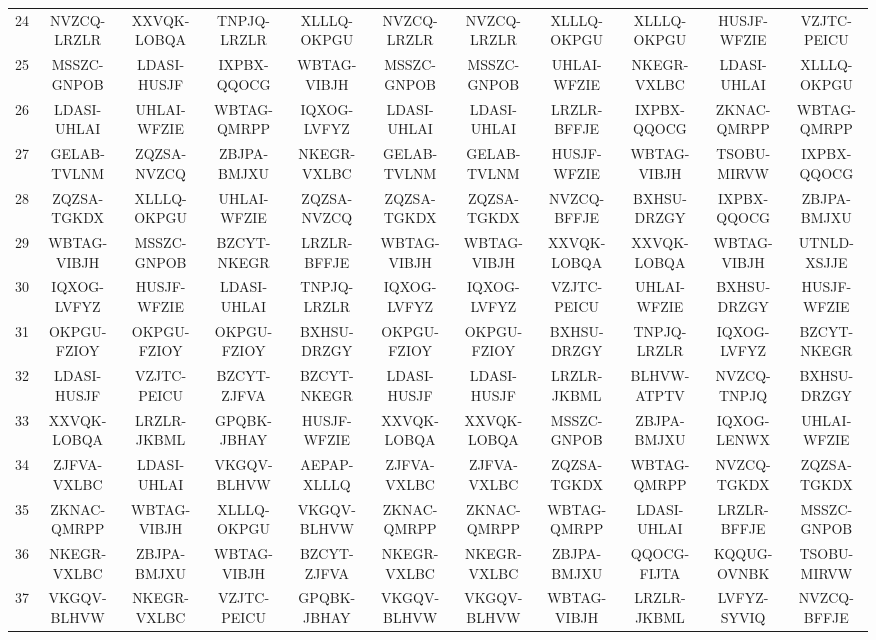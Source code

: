\begin{landscape}
{\begin{longtable}{ccccccccccc}
24 &  NVZCQ-LRZLR &  XXVQK-LOBQA &  TNPJQ-LRZLR &  XLLLQ-OKPGU &  NVZCQ-LRZLR &  NVZCQ-LRZLR &  XLLLQ-OKPGU &  XLLLQ-OKPGU &  HUSJF-WFZIE &  VZJTC-PEICU \\
25 &  MSSZC-GNPOB &  LDASI-HUSJF &  IXPBX-QQOCG &  WBTAG-VIBJH &  MSSZC-GNPOB &  MSSZC-GNPOB &  UHLAI-WFZIE &  NKEGR-VXLBC &  LDASI-UHLAI &  XLLLQ-OKPGU \\
26 &  LDASI-UHLAI &  UHLAI-WFZIE &  WBTAG-QMRPP &  IQXOG-LVFYZ &  LDASI-UHLAI &  LDASI-UHLAI &  LRZLR-BFFJE &  IXPBX-QQOCG &  ZKNAC-QMRPP &  WBTAG-QMRPP \\
27 &  GELAB-TVLNM &  ZQZSA-NVZCQ &  ZBJPA-BMJXU &  NKEGR-VXLBC &  GELAB-TVLNM &  GELAB-TVLNM &  HUSJF-WFZIE &  WBTAG-VIBJH &  TSOBU-MIRVW &  IXPBX-QQOCG \\
28 &  ZQZSA-TGKDX &  XLLLQ-OKPGU &  UHLAI-WFZIE &  ZQZSA-NVZCQ &  ZQZSA-TGKDX &  ZQZSA-TGKDX &  NVZCQ-BFFJE &  BXHSU-DRZGY &  IXPBX-QQOCG &  ZBJPA-BMJXU \\
29 &  WBTAG-VIBJH &  MSSZC-GNPOB &  BZCYT-NKEGR &  LRZLR-BFFJE &  WBTAG-VIBJH &  WBTAG-VIBJH &  XXVQK-LOBQA &  XXVQK-LOBQA &  WBTAG-VIBJH &  UTNLD-XSJJE \\
30 &  IQXOG-LVFYZ &  HUSJF-WFZIE &  LDASI-UHLAI &  TNPJQ-LRZLR &  IQXOG-LVFYZ &  IQXOG-LVFYZ &  VZJTC-PEICU &  UHLAI-WFZIE &  BXHSU-DRZGY &  HUSJF-WFZIE \\
31 &  OKPGU-FZIOY &  OKPGU-FZIOY &  OKPGU-FZIOY &  BXHSU-DRZGY &  OKPGU-FZIOY &  OKPGU-FZIOY &  BXHSU-DRZGY &  TNPJQ-LRZLR &  IQXOG-LVFYZ &  BZCYT-NKEGR \\
32 &  LDASI-HUSJF &  VZJTC-PEICU &  BZCYT-ZJFVA &  BZCYT-NKEGR &  LDASI-HUSJF &  LDASI-HUSJF &  LRZLR-JKBML &  BLHVW-ATPTV &  NVZCQ-TNPJQ &  BXHSU-DRZGY \\
33 &  XXVQK-LOBQA &  LRZLR-JKBML &  GPQBK-JBHAY &  HUSJF-WFZIE &  XXVQK-LOBQA &  XXVQK-LOBQA &  MSSZC-GNPOB &  ZBJPA-BMJXU &  IQXOG-LENWX &  UHLAI-WFZIE \\
34 &  ZJFVA-VXLBC &  LDASI-UHLAI &  VKGQV-BLHVW &  AEPAP-XLLLQ &  ZJFVA-VXLBC &  ZJFVA-VXLBC &  ZQZSA-TGKDX &  WBTAG-QMRPP &  NVZCQ-TGKDX &  ZQZSA-TGKDX \\
35 &  ZKNAC-QMRPP &  WBTAG-VIBJH &  XLLLQ-OKPGU &  VKGQV-BLHVW &  ZKNAC-QMRPP &  ZKNAC-QMRPP &  WBTAG-QMRPP &  LDASI-UHLAI &  LRZLR-BFFJE &  MSSZC-GNPOB \\
36 &  NKEGR-VXLBC &  ZBJPA-BMJXU &  WBTAG-VIBJH &  BZCYT-ZJFVA &  NKEGR-VXLBC &  NKEGR-VXLBC &  ZBJPA-BMJXU &  QQOCG-FIJTA &  KQQUG-OVNBK &  TSOBU-MIRVW \\
37 &  VKGQV-BLHVW &  NKEGR-VXLBC &  VZJTC-PEICU &  GPQBK-JBHAY &  VKGQV-BLHVW &  VKGQV-BLHVW &  WBTAG-VIBJH &  LRZLR-JKBML &  LVFYZ-SYVIQ &  NVZCQ-BFFJE \\

\end{longtable}}
\end{landscape}
